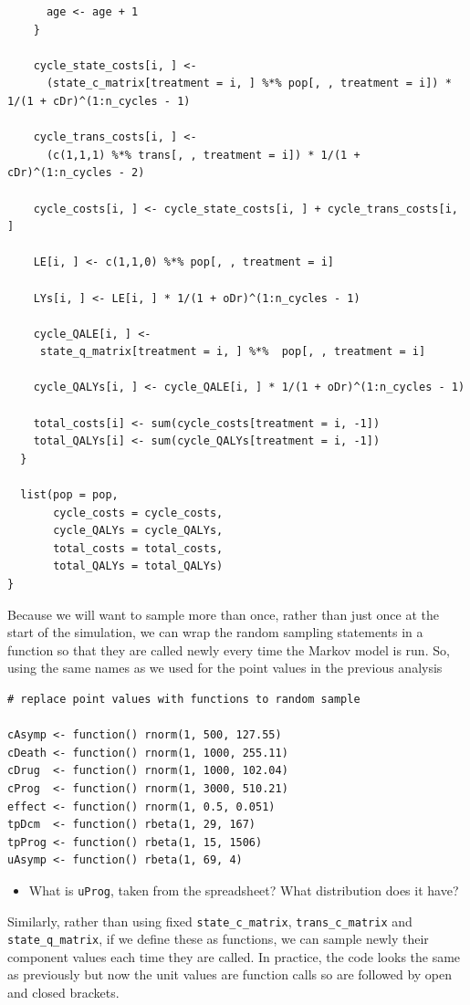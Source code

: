 \begin{verbatim}
      age <- age + 1
    }
    
    cycle_state_costs[i, ] <-
      (state_c_matrix[treatment = i, ] %*% pop[, , treatment = i]) * 1/(1 + cDr)^(1:n_cycles - 1)
    
    cycle_trans_costs[i, ] <-
      (c(1,1,1) %*% trans[, , treatment = i]) * 1/(1 + cDr)^(1:n_cycles - 2)
    
    cycle_costs[i, ] <- cycle_state_costs[i, ] + cycle_trans_costs[i, ]
    
    LE[i, ] <- c(1,1,0) %*% pop[, , treatment = i]
    
    LYs[i, ] <- LE[i, ] * 1/(1 + oDr)^(1:n_cycles - 1)
    
    cycle_QALE[i, ] <-
     state_q_matrix[treatment = i, ] %*%  pop[, , treatment = i]
    
    cycle_QALYs[i, ] <- cycle_QALE[i, ] * 1/(1 + oDr)^(1:n_cycles - 1)
    
    total_costs[i] <- sum(cycle_costs[treatment = i, -1])
    total_QALYs[i] <- sum(cycle_QALYs[treatment = i, -1])
  }
  
  list(pop = pop,
       cycle_costs = cycle_costs,
       cycle_QALYs = cycle_QALYs,
       total_costs = total_costs,
       total_QALYs = total_QALYs)
}
\end{verbatim}

Because we will want to sample more than once, rather than just once at the start of the simulation, we can wrap the random sampling statements in a function so that they are called newly every time the Markov model is run. So, using the same names as we used for the point values in the previous analysis

\begin{verbatim}
# replace point values with functions to random sample

cAsymp <- function() rnorm(1, 500, 127.55)
cDeath <- function() rnorm(1, 1000, 255.11)
cDrug  <- function() rnorm(1, 1000, 102.04)
cProg  <- function() rnorm(1, 3000, 510.21)
effect <- function() rnorm(1, 0.5, 0.051)
tpDcm  <- function() rbeta(1, 29, 167)
tpProg <- function() rbeta(1, 15, 1506)
uAsymp <- function() rbeta(1, 69, 4)
\end{verbatim}

\begin{itemize}
\item What is \texttt{uProg}, taken from the spreadsheet? What distribution does it have?
\end{itemize}

Similarly, rather than using fixed \texttt{state\_c\_matrix}, \texttt{trans\_c\_matrix} and \texttt{state\_q\_matrix}, if we define these as functions, we can sample newly their component values each time they are called. In practice, the code looks the same as previously but now the unit values are function calls so are followed by open and closed brackets. 

